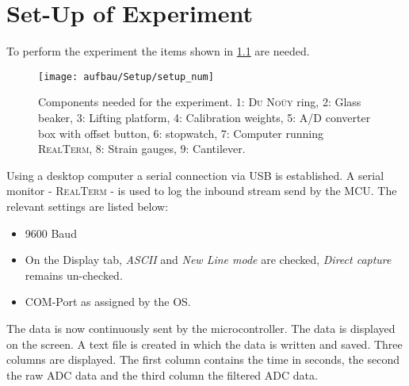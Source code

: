 \chapter{Set-Up of Experiment}
To perform the experiment the items shown in \cref{fig:setup} are needed.
 \begin{figure}[H]
	\centering
	\texttt{[image: aufbau/Setup/setup\_num]}
	\caption[Components needed for the experiment]{Components needed for the experiment. 1: \textsc{Du Noüy} ring, 2: Glass beaker, 3: Lifting platform, 4: Calibration weights, 5: A/D converter box with offset button, 6: stopwatch, 7: Computer running \textsc{RealTerm}, 8: Strain gauges, 9: Cantilever.}
	\label{fig:setup}
\end{figure}

Using a desktop computer a serial connection via USB is established. A serial monitor - \textsc{RealTerm} - is used to
log the inbound stream send by the MCU. The relevant settings are listed below:
\begin{itemize}
	\item 9600 Baud
	\item On the Display tab, \textit{ASCII} and \textit{New Line mode} are checked, \textit{Direct capture} remains
	un-checked.
	\item COM-Port as assigned by the OS.
\end{itemize}
The data is now continuously sent by the microcontroller. The data is displayed on the screen. A text file is created in
which the data is written and saved. Three columns are displayed. The first column contains the time in seconds, the second
the raw ADC data and the third column the filtered ADC data.\par
